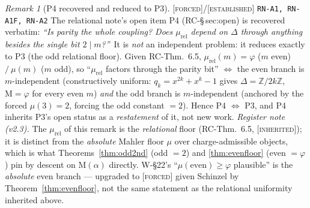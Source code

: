 \documentclass[11pt]{article}
\newcommand{\tagF}{\textcolor{cF}{\textsc{[forced]}}}
\newcommand{\tagI}{\textcolor{cI}{\textsc{[inherited]}}}
\newcommand{\tagE}{\textcolor{cE}{\textsc{[established]}}}
\newcommand{\hx}[1]{\textcolor{cC}{\footnotesize\texttt{#1}}}
\newcommand{\Z}{\mathbb{Z}}
\newcommand{\gp}{\varphi}
\newcommand{\M}{\mathrm{M}}
\theoremstyle{plain}
\theoremstyle{definition}
\theoremstyle{remark}
\newtheorem{remark}[theorem]{Remark}
\begin{document}
\begin{remark}[P4 recovered and reduced to P3]\label{rem:p4recover}\tagF{}/\tagE{} \hx{RN-A1, RN-A1F, RN-A2}
The relational note's open item P4 (RC-\S\,sec:open) is recovered verbatim:
\emph{``Is parity the whole coupling? Does $\mu_{\mathrm{rel}}$ depend on
$\Delta$ through anything besides the single bit $2\mid m$?''}\ It is
\emph{not} an independent problem: it reduces exactly to P3 (the odd relational
floor). Given RC-Thm.~6.5, $\mu_{\mathrm{rel}}(m)=\gp$ ($m$ even) $/\ \mu(m)$
($m$ odd), so ``$\mu_{\mathrm{rel}}$ factors through the parity bit'' $\iff$
the even branch is $m$-independent (constructively uniform: $q_k=x^{2k}+x^k-1$
gives $\Delta=\Z/2k\Z$, $\M=\gp$ for every even $m$) \emph{and} the odd branch
is $m$-independent (anchored by the forced $\mu(3)=2$, forcing the odd constant
$=2$). Hence P4 $\iff$ P3, and P4 inherits P3's open status as a
\emph{restatement} of it, not new work.
\emph{Register note (v2.3).} The $\mu_{\mathrm{rel}}$ of this remark is the
\emph{relational} floor (RC-Thm.\ 6.5, \tagI{}); it is distinct from the
\emph{absolute} Mahler floor $\mu$ over charge-admissible objects, which is what
Theorems~\ref{thm:odd2nd} (odd $=2$) and \ref{thm:evenfloor} (even $=\gp$) pin by
descent on $\M(\alpha)$ directly. W-\S22's ``$\mu(\text{even})\ge\gp$
plausible'' is the \emph{absolute} even branch --- upgraded to \tagF{} given
Schinzel by Theorem~\ref{thm:evenfloor}, not the same statement as the relational
uniformity inherited above.
\end{remark}
\end{document}
